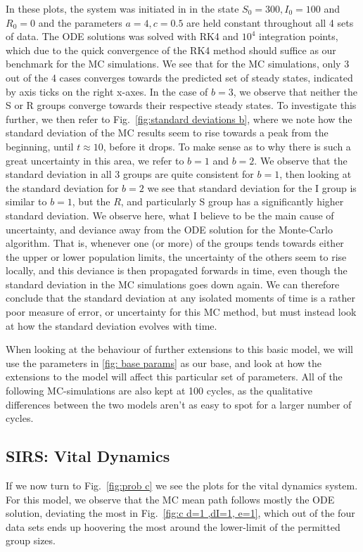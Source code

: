 \documentclass[10pt,showpacs,preprintnumbers,amsmath,amssymb,nofootinbib,aps,prl,twocolumn,groupedaddress,superscriptaddress,showkeys]{revtex4-1}
\begin{document}
    In these plots, the system was initiated in in the state $S_0 = 300, I_0=100$ and $R_0=0$ and the parameters $a=4, c=0.5$ are held constant throughout all 4 sets of data. The ODE solutions was solved with RK4 and $10^4$ integration points, which due to the quick convergence of the RK4 method should suffice as our benchmark for the MC simulations. We see that for the MC simulations, only 3 out of the 4 cases converges towards the predicted set of steady states, indicated by axis ticks on the right x-axes. In the case of $b=3$, we observe that neither the S or R groups converge towards their respective steady states. To investigate this further, we then refer to Fig.~\ref{fig:standard deviations b}, where we note how the standard deviation of the MC results seem to rise towards a peak from the beginning, until $t\approx10$, before it drops. To make sense as to why there is such a great uncertainty in this area, we refer to $b=1$ and $b=2$. We observe that the standard deviation in all 3 groups are quite consistent for $b=1$, then looking at the standard deviation for $b=2$  we see that standard deviation for the I group is similar to $b=1$, but the $R$, and particularly S group has a significantly higher standard deviation. We observe here, what I believe to be the main cause of uncertainty, and deviance away from the ODE solution for the Monte-Carlo algorithm. That is, whenever one (or more) of the groups tends towards either the upper or lower population limits, the uncertainty of the others seem to rise locally, and this deviance is then propagated forwards in time, even though the standard deviation in the MC simulations goes down again. We can therefore conclude that the standard deviation at any isolated moments of time is a rather poor measure of error, or uncertainty for this MC method, but must instead look at how the standard deviation evolves with time.

    When looking at the behaviour of further extensions to this basic model, we will use the parameters in \ref{fig: base params} as our base, and look at how the extensions to the model will affect this particular set of parameters. All of the following MC-simulations are also kept at 100 cycles, as the qualitative differences between the two models aren't as easy to spot for a larger number of cycles.
    
  \subsection{SIRS: Vital Dynamics}
    If we now turn to Fig.~\ref{fig:prob c} we see the plots for the vital dynamics system.
    For this model, we observe that the MC mean path follows mostly the ODE solution, deviating the most in Fig.~\ref{fig:c d=1 ,dI=1, e=1}, which out of the four data sets ends up hoovering the most around the lower-limit of the permitted group sizes.
\end{document}
